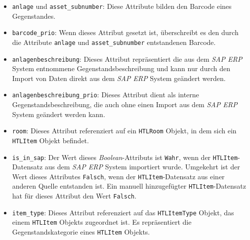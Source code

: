 \begin{itemize}
\tightlist
\item
  \texttt{anlage} und \texttt{asset\_subnumber}: Diese Attribute bilden
  den Barcode eines Gegenstandes.
\item
  \texttt{barcode\_prio}: Wenn dieses Attribut gesetzt ist, überschreibt
  es den durch die Attribute \texttt{anlage} und
  \texttt{asset\_subnumber} entstandenen Barcode.
\item
  \texttt{anlagenbeschreibung}: Dieses Attribut repräsentiert die aus
  dem \emph{SAP ERP}
  System entnommene Gegenstandsbeschreibung und kann nur durch den
  Import von Daten direkt aus dem \emph{SAP ERP}
  System geändert werden.
\item
  \texttt{anlagenbeschreibung\_prio}: Dieses Attribut dient als interne
  Gegenstandsbeschreibung, die auch ohne einen Import aus dem
  \emph{SAP ERP}
  System geändert werden kann.
\item
  \texttt{room}: Dieses Attribut referenziert auf ein \texttt{HTLRoom}
  Objekt, in dem sich ein \texttt{HTLItem} Objekt befindet.
\item
  \texttt{is\_in\_sap}: Der Wert dieses
  \emph{Boolean}-Attributs
  ist \texttt{Wahr}, wenn der \texttt{HTLItem}-Datensatz aus dem
  \emph{SAP ERP}
  System importiert wurde. Umgekehrt ist der Wert dieses Attributes
  \texttt{Falsch}, wenn der \texttt{HTLItem}-Datensatz aus einer anderen
  Quelle entstanden ist. Ein manuell hinzugefügter
  \texttt{HTLItem}-Datensatz hat für dieses Attribut den Wert
  \texttt{Falsch}.
\item
  \texttt{item\_type}: Dieses Attribut referenziert auf das
  \texttt{HTLItemType} Objekt, das einem \texttt{HTLItem} Objekts
  zugeordnet ist. Es repräsentiert die Gegenstandskategorie eines
  \texttt{HTLItem} Objekts.
\end{itemize}

